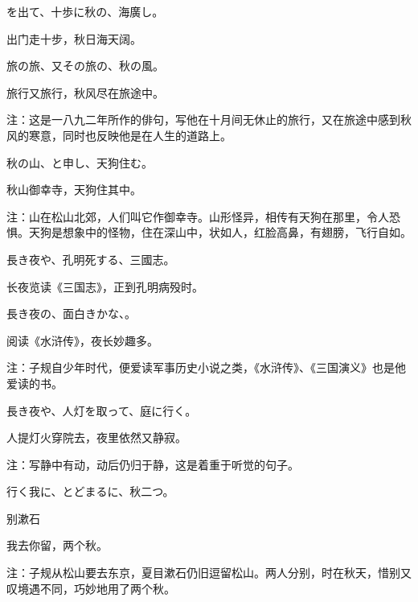 \begin{haiku}
    {\FH {}を出て、十歩に秋の、海廣し。}

    {\FK 出门走十步，秋日海天阔。}
\end{haiku}

\begin{haiku}
    {\FH 旅の旅、又その旅の、秋の風。}

    {\FK 旅行又旅行，秋风尽在旅途中。}

    {\FT 注：这是一八九二年所作的俳句，写他在十月间无休止的旅行，又在旅途中感到秋风的寒意，同时也反映他是在人生的道路上。}
\end{haiku}

\begin{haiku}
    {\FH 秋の山、と申し、天狗住む。}

    {\FK 秋山御幸寺，天狗住其中。}

    {\FT 注：山在松山北郊，人们叫它作御幸寺。山形怪异，相传有天狗在那里，令人恐惧。天狗是想象中的怪物，住在深山中，状如人，红脸高鼻，有翅膀，飞行自如。}
\end{haiku}

\begin{haiku}
    {\FH 長き夜や、孔明死する、三國志。}

    {\FK 长夜览读《三国志》，正到孔明病殁时。}
\end{haiku}

\begin{haiku}
    {\FH 長き夜の、面白きかな、。}

    {\FK 阅读《水浒传》，夜长妙趣多。}

    {\FT 注：子规自少年时代，便爱读军事历史小说之类，《水浒传》、《三国演义》也是他爱读的书。}
\end{haiku}

\begin{haiku}
    {\FH 長き夜や、人灯を取って、庭に行く。}

    {\FK 人提灯火穿院去，夜里依然又静寂。}

    {\FT 注：写静中有动，动后仍归于静，这是着重于听觉的句子。}
\end{haiku}

\begin{haiku}
    {\FH 行く我に、とどまるに、秋二つ。}

    {\FK 别漱石}

    {\FK 我去你留，两个秋。}

    {\FT 注：子规从松山要去东京，夏目漱石仍旧逗留松山。两人分别，时在秋天，惜别又叹境遇不同，巧妙地用了两个秋。}
\end{haiku}

